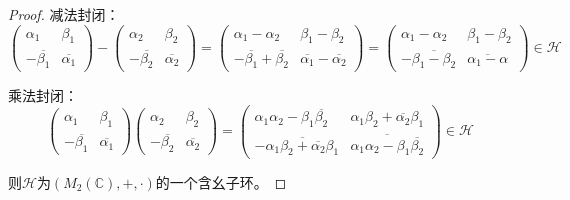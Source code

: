\documentclass[12pt, a4paper, oneside]{ctexart}
\begin{document}
\begin{proof}
    减法封闭：
    \begin{equation*}
        \begin{pmatrix}
            \alpha_1&\beta_1\\-\overline{\beta_1}&\overline{\alpha_1}
        \end{pmatrix}
        -
        \begin{pmatrix}
            \alpha_2&\beta_2\\-\overline{\beta_2}&\overline{\alpha_2}
        \end{pmatrix}
        =\begin{pmatrix}
            \alpha_1-\alpha_2&\beta_1-\beta_2\\-\overline{\beta_1}+\overline{\beta_2}&\overline{\alpha_1}-\overline{\alpha_2}
        \end{pmatrix}
        =\begin{pmatrix}
            \alpha_1-\alpha_2&\beta_1-\beta_2\\-\overline{\beta_1-\beta_2}&\overline{\alpha_1-\alpha}
        \end{pmatrix}
        \in \mathcal{H}
    \end{equation*}

    乘法封闭：
    \begin{equation*}
        \begin{pmatrix}
            \alpha_1&\beta_1\\-\overline{\beta_1}&\overline{\alpha_1}
        \end{pmatrix}
        \begin{pmatrix}
            \alpha_2&\beta_2\\-\overline{\beta_2}&\overline{\alpha_2}
        \end{pmatrix}
        =\begin{pmatrix}
            \alpha_1\alpha_2-\beta_1\overline{\beta_2}&\alpha_1\beta_2+\overline{\alpha_2}\beta_1\\
            -\overline{\alpha_1\beta_2+\overline{\alpha_2}\beta_1}&\overline{\alpha_1\alpha_2-\beta_1\overline{\beta_2}}
        \end{pmatrix}\in \mathcal{H}
    \end{equation*}

    则$\mathcal{H}$为$(M_2(\mathbb{C}),+,\cdot)$的一个含幺子环。


\end{proof}
\end{document}
